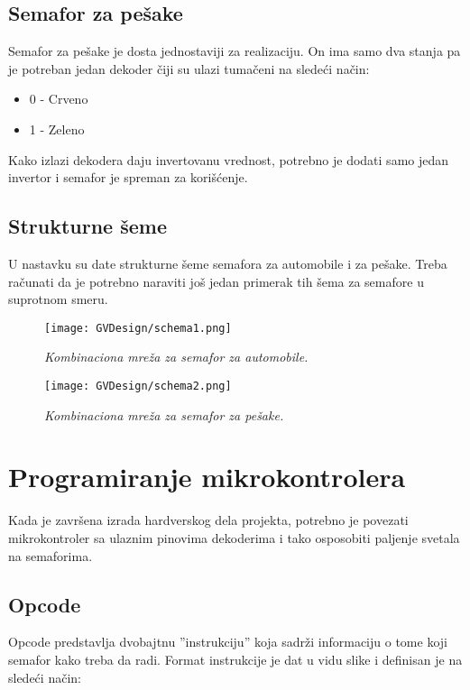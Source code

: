 \documentclass[a4paper,12pt, projekat]{etf}
\begin{document}
\subsection{Semafor za pešake}
Semafor za pešake je dosta jednostaviji za realizaciju. On ima samo dva stanja pa je potreban jedan dekoder čiji su ulazi tumačeni na sledeći način:
\begin{itemize}
  \item 0 - Crveno
  \item 1 - Zeleno
\end{itemize}
Kako izlazi dekodera daju invertovanu vrednost, potrebno je dodati samo jedan invertor i semafor je spreman za korišćenje. 

\subsection{Strukturne šeme}
U nastavku su date strukturne šeme semafora za automobile i za pešake. Treba računati da je potrebno naraviti još jedan primerak tih šema za semafore u suprotnom smeru.

\begin{figure}[!htb]
\centering
\texttt{[image: GVDesign/schema1.png]}
\begin{center}
\caption{\emph{Kombinaciona mreža za semafor za automobile.}}
\end{center}
\label{fig:comnetvehicles}
\end{figure}

\begin{figure}[!htb]
\centering
\texttt{[image: GVDesign/schema2.png]}
\begin{center}
\caption{\emph{Kombinaciona mreža za semafor za pešake.}}
\end{center}
\label{fig:comnetpassengers}
\end{figure}

\section{Programiranje mikrokontrolera}
Kada je završena izrada hardverskog dela projekta, potrebno je povezati mikrokontroler sa ulaznim pinovima dekoderima i tako osposobiti paljenje svetala na semaforima.

\subsection{Opcode}
Opcode predstavlja dvobajtnu ''instrukciju'' koja sadrži informaciju o tome koji semafor kako treba da radi. Format instrukcije je dat u vidu slike i definisan je na sledeći način:
\end{document}
